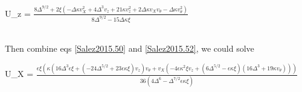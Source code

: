 \documentclass[books,12pt]{elegantpaper}
\newcommand{\pder}[2][]{\frac{\partial#1}{\partial#2}}
\newcommand{\beq}{\begin{equation}}
\newcommand{\eeq}{\end{equation}}
\newcommand{\tlag}[1]{\tag{#1} \label{#1}}
\newcommand{\veps}{\varepsilon}
\newcommand{\llang}{\left\langle}
\newcommand{\rrang}{\right\rangle}
\begin{document}




\begin{doublespace} U_z = \noindent\(\frac{8 \Delta ^{9/2}+2 \xi  \left(-\Delta  \kappa  v_X^2+4 \Delta ^3 v_z+21 \kappa  v_z^2+2 \Delta  \kappa  v_X v_{\theta }-\Delta  \kappa v_{\theta }^2\right)}{8 \Delta ^{9/2}-15 \Delta  \kappa  \xi }\) \end{doublespace} \\
Then combine eqs \ref{Salez2015.50} and \ref{Salez2015.52}, we could solve

\begin{doublespace} U_X =
\noindent\(\frac{\epsilon  \xi  \left(\kappa  \left(16 \Delta ^3 \epsilon  \xi +\left(-24 \Delta ^{5/2}+23 \epsilon  \kappa  \xi \right) v_z\right)
v_{\theta }+v_X \left(-4 \epsilon  \kappa ^2 \xi  v_z+\left(6 \Delta ^{5/2}-\epsilon  \kappa  \xi \right) \left(16 \Delta ^3+19 \kappa  v_{\theta
}\right)\right)\right)}{36 \left(4 \Delta ^6-\Delta ^{7/2} \epsilon  \kappa  \xi \right)}\)
\end{doublespace}
\end{document}

